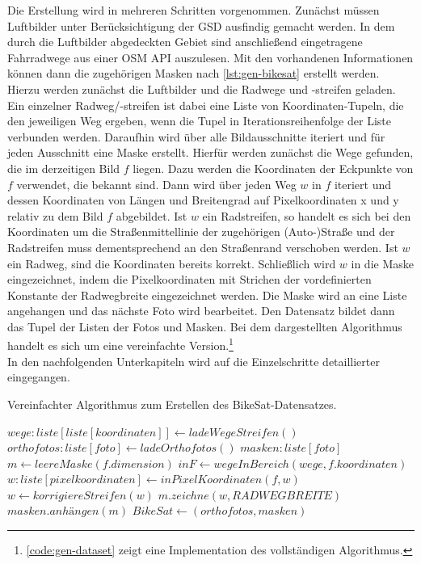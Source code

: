 Die Erstellung wird in mehreren Schritten vorgenommen.
Zunächst müssen Luftbilder unter Berücksichtigung der \ac{GSD} ausfindig gemacht werden.
In dem durch die Luftbilder abgedeckten Gebiet sind anschließend eingetragene Fahrradwege aus einer \ac{OSM} API auszulesen.
Mit den vorhandenen Informationen können dann die zugehörigen Masken nach \autoref{lst:gen-bikesat} erstellt werden.
Hierzu werden zunächst die Luftbilder und die Radwege und -streifen geladen. Ein einzelner Radweg/-streifen 
ist dabei eine Liste von Koordinaten-Tupeln, die den jeweiligen Weg ergeben, 
wenn die Tupel in Iterationsreihenfolge der Liste verbunden werden.
Daraufhin wird über alle Bildausschnitte iteriert und für jeden Ausschnitt eine Maske erstellt. 
Hierfür werden zunächst die Wege gefunden, die im derzeitigen Bild $f$ liegen. Dazu werden die Koordinaten der 
Eckpunkte von $f$ verwendet, die bekannt sind. Dann wird über jeden Weg $w$ in $f$ iteriert und dessen 
Koordinaten von Längen und Breitengrad auf Pixelkoordinaten x und y relativ zu dem Bild $f$ abgebildet. 
Ist $w$ ein Radstreifen, so handelt es sich bei den Koordinaten um die Straßenmittellinie 
der zugehörigen (Auto-)Straße
und der Radstreifen muss dementsprechend an den Straßenrand verschoben werden. Ist $w$ ein Radweg,
sind die Koordinaten bereits korrekt. Schließlich wird $w$ in die Maske eingezeichnet, 
indem die Pixelkoordinaten mit Strichen der vordefinierten Konstante der Radwegbreite eingezeichnet werden.
Die Maske wird an eine Liste angehangen und das nächste Foto wird bearbeitet. Den Datensatz bildet 
dann das Tupel der Listen der Fotos und Masken. Bei dem dargestellten Algorithmus handelt es sich um eine 
vereinfachte Version.\footnote{\autoref{code:gen-dataset} zeigt eine Implementation des vollständigen Algorithmus.} \\   
In den nachfolgenden Unterkapiteln wird auf die Einzelschritte detaillierter eingegangen.

\begin{algorithm}
	\caption{Vereinfachter Algorithmus zum Erstellen des BikeSat-Datensatzes.}\label{lst:gen-bikesat}
	\begin{algorithmic}[1]
		\State $wege: liste[liste[koordinaten]] \gets ladeWegeStreifen()$ 
		\State $orthofotos: liste[foto]\gets ladeOrthofotos()$ 
		\State $masken: liste[foto]$
			\State $m \gets leereMaske(f.dimension)$
			\State $inF \gets wegeInBereich(wege, f.koordinaten)$
				\State $w: liste[pixelkoordinaten] \gets inPixelKoordinaten(f, w)$
				 
					\State $w \gets korrigiereStreifen(w)$
				\EndIf
				\State $m.zeichne(w, RADWEGBREITE)$
			\EndFor
			\State $masken.anhängen(m)$
		\EndFor
		\State $BikeSat \gets (orthofotos, masken)$
	\end{algorithmic}
\end{algorithm}

